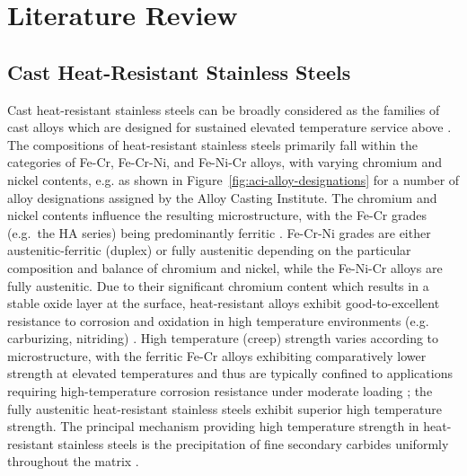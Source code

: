 \chapter{Literature Review} \label{ch:literature-review}

\section{Cast Heat-Resistant Stainless Steels}
Cast heat-resistant stainless steels can be broadly considered as the families of cast alloys which are designed for sustained elevated temperature service above  \cite{blair_cast_stainless_1990}.  The compositions of heat-resistant stainless steels primarily fall within the categories of Fe-Cr, Fe-Cr-Ni, and Fe-Ni-Cr alloys, with varying chromium and nickel contents, e.g. as shown in Figure~\ref{fig:aci-alloy-designations} for a number of alloy designations assigned by the Alloy Casting Institute. The chromium and nickel contents influence the resulting microstructure, with the Fe-Cr grades (e.g.~the HA series) being predominantly ferritic \cite{davis_metallurgy_1994}. Fe-Cr-Ni grades are either austenitic-ferritic (duplex) or fully austenitic depending on the particular composition and balance of chromium and nickel, while the Fe-Ni-Cr alloys are fully austenitic. Due to their significant chromium content which results in a stable oxide layer at the surface, heat-resistant alloys exhibit good-to-excellent resistance to corrosion and oxidation in high temperature environments (e.g. carburizing, nitriding) \cite{davis_metallurgy_1994}. High temperature (creep) strength varies according to microstructure, with the ferritic Fe-Cr alloys exhibiting comparatively lower strength at elevated temperatures \cite{avery_cast_1969} and thus are typically confined to applications requiring high-temperature corrosion resistance under moderate loading \cite{davis_metallurgy_1994}; the fully austenitic heat-resistant stainless steels exhibit superior high temperature strength. The principal mechanism providing high temperature strength in heat-resistant stainless steels is the precipitation of fine secondary carbides uniformly throughout the matrix \cite{avery_cast_1969,davis_metallurgy_1994}. 



